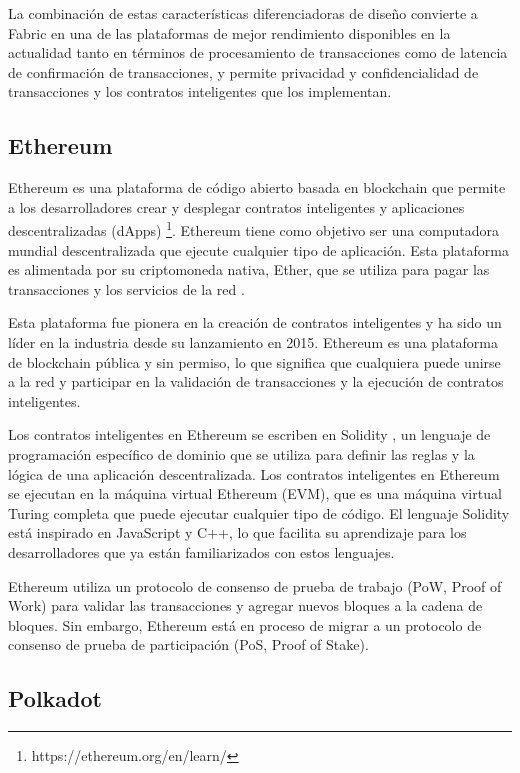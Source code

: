\documentclass[theoretical-framework.tex]{subfiles}
\begin{document}
La combinación de estas características diferenciadoras de diseño convierte a Fabric en una de las plataformas de mejor rendimiento disponibles en la actualidad tanto en términos de procesamiento de transacciones como de latencia de confirmación de transacciones, y permite privacidad y confidencialidad de transacciones y los contratos inteligentes que los implementan.

\subsection{Ethereum}

Ethereum es una plataforma de código abierto basada en blockchain que permite a los desarrolladores crear y desplegar contratos inteligentes y aplicaciones descentralizadas (dApps) \footnote{https://ethereum.org/en/learn/}. Ethereum tiene como objetivo ser una computadora mundial descentralizada que ejecute cualquier tipo de aplicación. Esta plataforma es alimentada por su criptomoneda nativa, Ether, que se utiliza para pagar las transacciones y los servicios de la red \cite{buterin2013ethereum}.

Esta plataforma fue pionera en la creación de contratos inteligentes y ha sido un líder en la industria desde su lanzamiento en 2015. Ethereum es una plataforma de blockchain pública y sin permiso, lo que significa que cualquiera puede unirse a la red y participar en la validación de transacciones y la ejecución de contratos inteligentes. 

Los contratos inteligentes en Ethereum se escriben en Solidity \cite{dannen2017introducing}, un lenguaje de programación específico de dominio que se utiliza para definir las reglas y la lógica de una aplicación descentralizada. Los contratos inteligentes en Ethereum se ejecutan en la máquina virtual Ethereum (EVM), que es una máquina virtual Turing completa que puede ejecutar cualquier tipo de código. El lenguaje Solidity está inspirado en JavaScript y C++, lo que facilita su aprendizaje para los desarrolladores que ya están familiarizados con estos lenguajes.

Ethereum utiliza un protocolo de consenso de prueba de trabajo (PoW, Proof of Work) para validar las transacciones y agregar nuevos bloques a la cadena de bloques. Sin embargo, Ethereum está en proceso de migrar a un protocolo de consenso de prueba de participación (PoS, Proof of Stake). 

\subsection{Polkadot}
\end{document}
